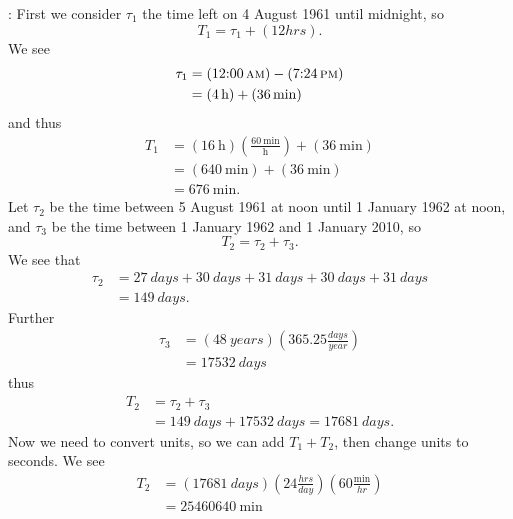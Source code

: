 \EXECUTE:
First we consider $\tau_{1}$ the time left on 4 August 1961 until
midnight, so
\begin{equation}
T_{1} = \tau_{1} + (12\si{hrs}).
\end{equation}
We see
\begin{subequations}
\begin{align}
\tau_{1} &= (\mbox{12:00\thinspace\sc
am})-(\mbox{7:24\thinspace\sc pm})\\
&=(\SI{4}{\hour})+(\SI{36}{\minute})
\end{align}
\end{subequations}
and thus
\begin{subequations}
\begin{align}
T_{1} &= (\SI{16}{\hour})\left(\frac{\SI{60}{\minute}}{\si{\hour}}\right)+
(\SI{36}{\minute})\\
&=(\SI{640}{\minute})+(\SI{36}{\minute})\\
&=\SI{676}{\minute}.
\end{align}
\end{subequations}
Let $\tau_{2}$ be the time between 5 August 1961 at noon until 1
January 1962 at noon, and $\tau_{3}$ be the time between 1
January 1962 and 1 January 2010, so
\begin{equation}
T_{2} = \tau_2+\tau_3.
\end{equation}
We see that
\begin{subequations}
\begin{align}
\tau_2 &= \SI{27}{days}+\SI{30}{days}+\SI{31}{days}+
\SI{30}{days}+\SI{31}{days}\\
&=\SI{149}{days}.
\end{align}
\end{subequations}
Further
\begin{subequations}
\begin{align}
\tau_3 &=
(\SI{48}{years})\left(365.25\frac{\si{days}}{\si{year}}\right)\\
&=\SI{17532}{days}
\end{align}
\end{subequations}
thus
\begin{equation}
\begin{split}
T_{2} &= \tau_2+\tau_3\\
&=\SI{149}{days}+\SI{17532}{days}=\SI{17681}{days}.
\end{split}
\end{equation}
Now we need to convert units, so we can add $T_1+T_2$, then
change units to seconds. We see
\begin{equation}
\begin{split}
T_{2} &=
(\SI{17681}{days})\left(24\frac{\si{hrs}}{\si{day}}\right)
\left(60\frac{\si{\minute}}{\si{hr}}\right)\\
&= \SI{25460640}{\minute}
\end{split}
\end{equation}
